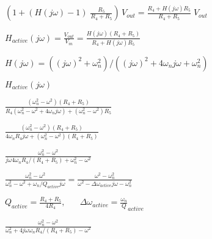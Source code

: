 \documentclass{article}
\def\lthtmlcheckvsize{\ifdim\ht\sizebox<\vsize 
  \ifdim\wd\sizebox<\hsize\expandafter\hfill\fi \expandafter\vfill
  \else\expandafter\vss\fi}%
\begin{document}
{\newpage\clearpage
{}%
$\displaystyle \left(1+(H(j\omega)-1)\;\frac{R_5}{R_4+R_5}\right)\,V_{out}
=\frac{R_4+H(j\omega)R_5}{R_4+R_5}\;V_{out}$%
\lthtmlindisplaymathZ
\lthtmlcheckvsize\clearpage}

{\newpage\clearpage
{}%
$\displaystyle H_{active}(j\omega)=\frac{V_{out}}{V_{in}}
=\frac{H(j\omega)(R_4+R_5)}{R_4+H(j\omega)R_5}
$%
\lthtmlindisplaymathZ
\lthtmlcheckvsize\clearpage}

{\newpage\clearpage
{}%
$H(j\omega)=((j\omega)^2+\omega_n^2)/((j\omega)^2+4\omega_n j\omega
+\omega_n^2)$%
\lthtmlindisplaymathZ
\lthtmlcheckvsize\clearpage}

{\newpage\clearpage
{}%
$\displaystyle H_{active}(j\omega)$%
\lthtmlindisplaymathZ
\lthtmlcheckvsize\clearpage}

{\newpage\clearpage
{}%
$\displaystyle \frac{(\omega_n^2-\omega^2)(R_4+R_5)}
{R_4(\omega_n^2-\omega^2+4\omega_n j\omega)+(\omega_n^2-\omega^2)R_5}$%
\lthtmlindisplaymathZ
\lthtmlcheckvsize\clearpage}

{\newpage\clearpage
{}%
$\displaystyle \frac{(\omega_n^2-\omega^2)(R_4+R_5)}
{4\omega_nR_4 j\omega+(\omega_n^2-\omega^2)(R_4+R_5)}$%
\lthtmlindisplaymathZ
\lthtmlcheckvsize\clearpage}

{\newpage\clearpage
{}%
$\displaystyle \frac{\omega_n^2-\omega^2}{j\omega 4\omega_n R_4/(R_4+R_5)+\omega_n^2-\omega^2}$%
\lthtmlindisplaymathZ
\lthtmlcheckvsize\clearpage}

{\newpage\clearpage
{}%
$\displaystyle \frac{\omega_n^2-\omega^2}{\omega_n^2-\omega^2+\omega_n/Q_{active} j\omega}
=\frac{\omega^2-\omega_n^2}{\omega^2-\Delta\omega_{active} j\omega-\omega^2_n}$%
\lthtmlindisplaymathZ
\lthtmlcheckvsize\clearpage}

{\newpage\clearpage
{}%
$\displaystyle Q_{active}=\frac{R_4+R_5}{4R_4},\;\;\;\;\;\;
\Delta\omega_{active}=\frac{\omega_n}{Q}_{active}
$%
\lthtmlindisplaymathZ
\lthtmlcheckvsize\clearpage}

{\newpage\clearpage
{}%
$\displaystyle \frac{\omega_n^2-\omega^2}{\omega_n^2+4j\omega\omega_n R_4/(R_4+R_5)-\omega^2}$%
\lthtmlindisplaymathZ
\lthtmlcheckvsize\clearpage}
\end{document}
